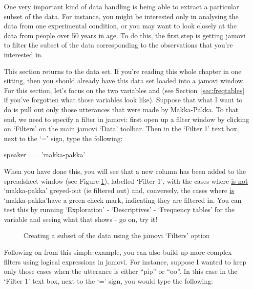One very important kind of data handling is being able to extract a particular subset of the data. For instance, you might be interested only in analysing the data from one experimental condition, or you may want to look closely at the data from people over 50 years in age. To do this, the first step is getting jamovi to filter the subset of the data corresponding to the observations that you're interested in. 

This section returns to the  data set. If you're reading this whole chapter in one sitting, then you should already have this data set loaded into a jamovi window. For this section, let's focus on the two variables  and  (see Section~\ref{sec:freqtables} if you've forgotten what those variables look like). Suppose that what I want to do is pull out only those utterances that were made by Makka-Pakka. To that end, we need to specify a filter in jamovi: first open up a filter window by clicking on `Filters' on the main jamovi `Data' toolbar. Then in the `Filter 1' text box, next to the `=' sign, type the following:

\begin{rblock1}
speaker == 'makka-pakka'
\end{rblock1}

When you have done this, you will see that a new column has been added to the spreadsheet window (see Figure \ref{fig:subset1}), labelled `Filter 1', with the cases where  \underline{is not} `makka-pakka' greyed-out (ie filtered out) and, conversely, the cases where  \underline{is} `makka-pakka'have a green check mark, indicating they are filtered in. You can test this by running `Exploration' - `Descriptives' - `Frequency tables' for the  variable and seeing what that shows - go on, try it!

\begin{figure}[h!!]
\begin{center}
\caption{Creating a subset of the  data using the jamovi `Filters' option}
\label{fig:subset1}
\HR
\end{center}
\end{figure}

Following on from this simple example, you can also build up more complex filters using logical expressions in jamovi. For instance, suppose I wanted to keep only those cases when the utterance is either ``pip'' or ``oo''. In this case in the `Filter 1' text box, next to the `=' sign, you would type the following:

